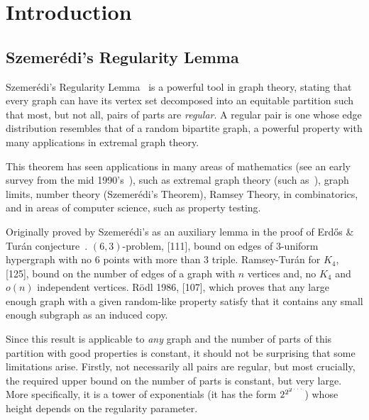 \section{Introduction} \label{sec:introduction}

    \subsection{Szemer\'edi's Regularity Lemma}

    Szemerédi's Regularity Lemma~\cite{regular_partitions_of_graphs} is a powerful tool in graph theory,
    stating that every graph can have its vertex set decomposed into an equitable partition such that most,
    but not all, pairs of parts are \emph{regular}.
    A regular pair is one whose edge distribution resembles that of a random bipartite graph, a powerful property with
    many applications in extremal graph theory.

    This theorem has seen applications in many areas of mathematics
    (see an early survey from the mid 1990's~\cite{survey of regularity lemma}), such as extremal graph
    theory (such as~\cite{kuhn ostus, ...}), graph limits, number theory (Szemer\'edi's Theorem), Ramsey Theory,
    in combinatorics, and in areas of computer science, such as property testing.

    Originally proved by Szemerédi's as an auxiliary lemma in the proof of Erd\H{o}s \& Turán
    conjecture~\cite{on_sets_of_integers_containing_no_four_elements_in_arithmetic_progression}.
    $(6, 3)$-problem, [111], bound on edges of $3$-uniform hypergraph with no $6$ points with more than $3$ triple.
    Ramsey-Turán for $K_4$, [125], bound on the number of edges of a graph with $n$ vertices and, no $K_4$ and $o(n)$
    independent vertices.
    Rödl 1986, [107], which proves that any large enough graph with a given random-like property satisfy that it contains
    any small enough subgraph as an induced copy.


    Since this result is applicable to \emph{any} graph and the number of parts of this partition with good properties is constant,
    it should not be surprising that some limitations arise.
    Firstly, not necessarily all pairs are regular, but most crucially, the required upper bound on the number of parts is
    constant, but very large.
    More specifically, it is a tower of exponentials (it has the form $2^{2^{2^{\text{\reflectbox{$\dots$}}}}}$)
    whose height depends on the regularity parameter.

